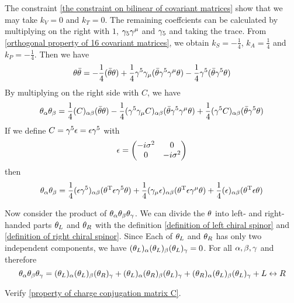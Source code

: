 The constraint \eqref{the constraint on bilinear of covariant matrices} show that we may take $k_V = 0$ and $k_T = 0$. The remaining coeffcients can be calculated by multiplying on the right with $1$, $\gamma_{5}\gamma^{\mu}$ and $\gamma_{5}$ and taking the trace. From \eqref{orthogonal property of 16 covariant matrices}, we obtain $k_S = -\frac{1}{4}$, $k_A = \frac{1}{4}$ and $k_P = -\frac{1}{4}$. Then we have
\begin{equation}
\theta\bar{\theta}=
-\frac{1}{4}(\bar{\theta}\theta)+
\frac{1}{4}\gamma^5\gamma_{\mu}(\bar{\theta}\gamma^5\gamma^{\mu}\theta)
-\frac{1}{4}\gamma^5(\bar{\theta}\gamma^{5}\theta)
\end{equation}  
By multiplying on the right side with $C$, we have
\begin{equation}
\theta_{\alpha}\theta_{\beta} = 
\frac{1}{4} (C)_{\alpha\beta} (\bar{\theta}\theta)- 
\frac{1}{4}(\gamma^5\gamma_{\mu}C)_{\alpha\beta}(\bar{\theta}\gamma^5\gamma^{\mu}\theta)+
\frac{1}{4}(\gamma^5C)_{\alpha\beta}(\bar{\theta}\gamma^{5}\theta)
\end{equation}
If we define $C = \gamma^5\epsilon = \epsilon\gamma^5$ with 
\begin{equation}
\e = \mqty(-i\s^2 &  0 \\
             0    & -i\s^2)
\end{equation}
then 
\begin{equation}
\theta_{\alpha}\theta_{\beta} = 
\frac{1}{4} (\epsilon\gamma^5)_{\alpha\beta} (\theta^{\text{T}}\epsilon\gamma^5\theta)+ 
\frac{1}{4}(\gamma_{\mu}\epsilon)_{\alpha\beta}({\theta}^{\text{T}}\epsilon\gamma^{\mu}\theta)+
\frac{1}{4}(\epsilon)_{\alpha\beta}(\theta^{\text{T}}\epsilon\theta)
\end{equation}

Now consider the product of $\theta_{\alpha}\theta_{\beta}\theta_{\gamma}$. We can divide the $\theta$ into left- and right-handed parts $\theta_L$ and $\theta_R$ with the definition \eqref{definition of left chiral spinor} and \eqref{definition of right chiral spinor}. Since Each of $\theta_L$ and $\theta_R$ has only two independent components, we have
$(\theta_L)_{\alpha}(\theta_L)_{\beta}(\theta_L)_{\gamma} = 0$. For all $\alpha,\beta,\gamma$ and therefore
\begin{equation}
\theta_\alpha \theta_\beta \theta_\gamma = 
(\theta_L)_\alpha(\theta_L)_\beta(\theta_R)_\gamma+
(\theta_L)_\alpha(\theta_R)_\beta(\theta_L)_\gamma+
(\theta_R)_\alpha(\theta_L)_\beta(\theta_L)_\gamma
+ L\leftrightarrow R
\end{equation}  

\begin{Exe}
	Verify \eqref{property of charge conjugation matrix C}.
\end{Exe}

